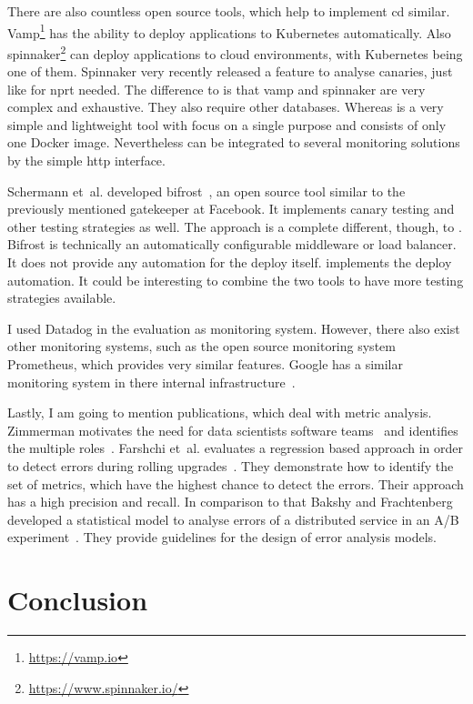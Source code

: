 There are also countless open source tools, which help to implement \gls{cd}
similar. Vamp\footnote{\url{https://vamp.io}} has the ability to deploy applications to
Kubernetes automatically. Also spinnaker\footnote{\url{https://www.spinnaker.io/}} can
deploy applications to cloud environments, with Kubernetes being one of them. Spinnaker
very recently released a feature to analyse canaries, just like for \gls{nprt} needed. The
difference to \deployer is that vamp and spinnaker are very complex and exhaustive. They
also require other databases. Whereas \deployer is a very simple and lightweight tool with
focus on a single purpose and consists of only one Docker image. Nevertheless \deployer can
be integrated to several monitoring solutions by the simple http interface.

Schermann et~al. developed bifrost~\cite{bifrost}, an open source tool similar to the
previously mentioned gatekeeper at Facebook. It implements canary testing and other
testing strategies as well. The approach is a complete different, though, to
\deployer. Bifrost is technically an automatically configurable middleware or
load balancer. It does not provide any automation for the deploy itself. \deployer
implements the deploy automation. It could be interesting to combine the two tools to have
more testing strategies available.

I used Datadog in the evaluation as monitoring system. However, there also exist other
monitoring systems, such as the open source monitoring system Prometheus, which provides
very similar features. Google has a similar monitoring system in there internal
infrastructure~\cite{sre_monitoring}.

Lastly, I am going to mention publications, which deal with metric analysis. Zimmerman
motivates the need for data scientists software teams~\cite{data_science_role2} and
identifies the multiple roles~\cite{data_science_role}. Farshchi et~al. evaluates a
regression based approach in order to detect errors during rolling
upgrades~\cite{anomaly_detection}. They demonstrate how to identify the set of metrics,
which have the highest chance to detect the errors. Their approach has a high precision
and recall. In comparison to that Bakshy and Frachtenberg developed a statistical model to
analyse errors of a distributed service in an A/B
experiment~\cite{error_analysis_of_distr_system}. They provide guidelines for the design
of error analysis models.

\chapter{Conclusion}
\label{chap:conclusion}


